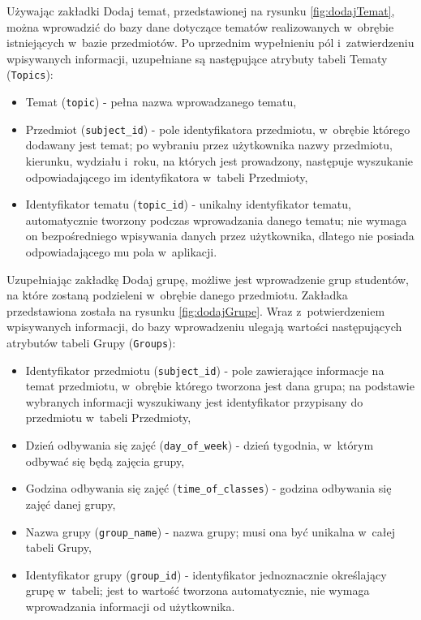 Używając zakładki Dodaj temat, przedstawionej na rysunku \ref{fig:dodajTemat}, można wprowadzić do bazy dane dotyczące tematów realizowanych w~obrębie istniejących w~bazie przedmiotów. Po uprzednim wypełnieniu pól i~zatwierdzeniu wpisywanych informacji, uzupełniane są następujące atrybuty tabeli Tematy (\verb!Topics!):
\begin{itemize}
\item Temat (\verb!topic!) - pełna nazwa wprowadzanego tematu,
\item Przedmiot (\verb!subject_id!) - pole identyfikatora przedmiotu, w~obrębie którego dodawany jest temat; po wybraniu przez użytkownika nazwy przedmiotu, kierunku, wydziału i~roku, na których jest prowadzony, następuje wyszukanie odpowiadającego im identyfikatora w~tabeli Przedmioty,
\item Identyfikator tematu (\verb!topic_id!) - unikalny identyfikator tematu, automatycznie tworzony podczas wprowadzania danego tematu; nie wymaga on bezpośredniego wpisywania danych przez użytkownika, dlatego nie posiada odpowiadającego mu pola w~aplikacji.
\end{itemize}

Uzupełniając zakładkę Dodaj grupę, możliwe jest wprowadzenie grup studentów, na które zostaną podzieleni w~obrębie danego przedmiotu. Zakładka przedstawiona została na rysunku \ref{fig:dodajGrupe}. Wraz z~potwierdzeniem wpisywanych informacji, do bazy wprowadzeniu ulegają wartości następujących atrybutów tabeli Grupy (\verb!Groups!):
\begin{itemize}
\item Identyfikator przedmiotu (\verb!subject_id!) - pole zawierające informacje na temat przedmiotu, w~obrębie którego tworzona jest dana grupa; na podstawie wybranych informacji wyszukiwany jest identyfikator przypisany do przedmiotu w~tabeli Przedmioty,
\item Dzień odbywania się zajęć (\verb!day_of_week!) - dzień tygodnia, w~którym odbywać się będą zajęcia grupy,
\item Godzina odbywania się zajęć (\verb!time_of_classes!) - godzina odbywania się zajęć danej grupy,
\item Nazwa grupy (\verb!group_name!) - nazwa grupy; musi ona być unikalna w~całej tabeli Grupy,
\item Identyfikator grupy (\verb!group_id!) - identyfikator jednoznacznie określający grupę w~tabeli; jest to wartość tworzona automatycznie, nie wymaga wprowadzania informacji od użytkownika.
\end{itemize}

